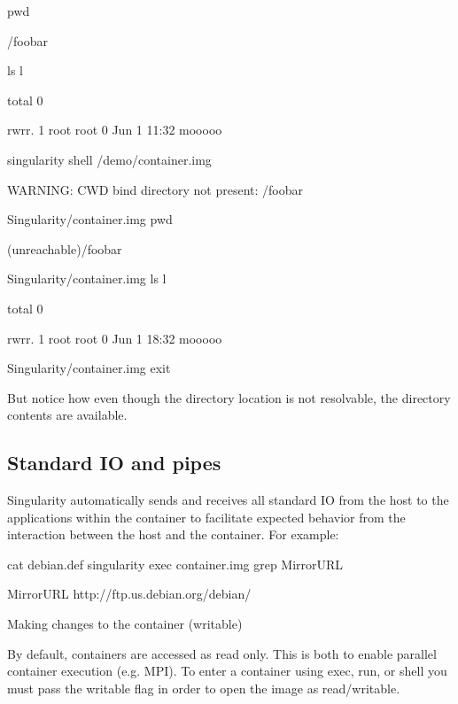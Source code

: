 \documentclass[letterpaper,10pt,english]{sphinxmanual}
\begin{document}
%
\begin{sphinxVerbatim}[commandchars=\\\{\}]
\PYGZdl{} pwd

/foobar

\PYGZdl{} ls \PYGZhy{}l

total 0

\PYGZhy{}rw\PYGZhy{}r\PYGZhy{}\PYGZhy{}r\PYGZhy{}\PYGZhy{}. 1 root root 0 Jun  1 11:32 mooooo

\PYGZdl{} singularity shell \PYGZti{}/demo/container.img

WARNING: CWD bind directory not present: /foobar

Singularity/container.img\PYGZgt{} pwd

(unreachable)/foobar

Singularity/container.img\PYGZgt{} ls \PYGZhy{}l

total 0

\PYGZhy{}rw\PYGZhy{}r\PYGZhy{}\PYGZhy{}r\PYGZhy{}\PYGZhy{}. 1 root root 0 Jun  1 18:32 mooooo

Singularity/container.img\PYGZgt{} exit

\PYGZdl{}
\end{sphinxVerbatim}

But notice how even though the directory location is not resolvable, the
directory contents are available.


\subsection{Standard IO and pipes}
\label{\detokenize{installation_environments:standard-io-and-pipes}}
Singularity automatically sends and receives all standard IO from the
host to the applications within the container to facilitate expected
behavior from the interaction between the host and the container. For
example:

%
\begin{sphinxVerbatim}[commandchars=\\\{\}]
\PYGZdl{} cat debian.def \textbar{} singularity exec container.img grep \PYGZsq{}MirrorURL\PYGZsq{}

MirrorURL \PYGZdq{}http://ftp.us.debian.org/debian/\PYGZdq{}

\PYGZdl{}

Making changes to the container (writable)

By default, containers are accessed as read only. This is both to enable parallel container execution (e.g. MPI). To enter a container using exec, run, or shell you must pass the \PYGZhy{}\PYGZhy{}writable flag in order to open the image as read/writable.
\end{sphinxVerbatim}
\end{document}
